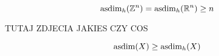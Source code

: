 \begin{theorem}{}{}
  $$\operatorname{asdim}_h(\mathbb{Z}^n)=\operatorname{asdim}_h(\mathbb{R}^n)\geq n$$
\end{theorem}

{\large\color{red}TUTAJ ZDJECIA JAKIES CZY COS}

\begin{theorem}{}{}
  $$\operatorname{asdim}(X)\geq\operatorname{asdim}_h(X)$$
\end{theorem}





